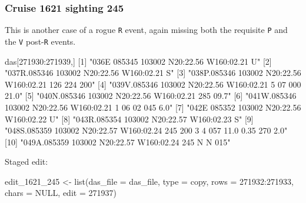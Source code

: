 \documentclass[
]{book}
\newenvironment{Shaded}{\begin{snugshade}}{\end{snugshade}}
\newcommand{\AttributeTok}[1]{\textcolor[rgb]{0.77,0.63,0.00}{#1}}
\newcommand{\ConstantTok}[1]{\textcolor[rgb]{0.00,0.00,0.00}{#1}}
\newcommand{\DecValTok}[1]{\textcolor[rgb]{0.00,0.00,0.81}{#1}}
\newcommand{\FunctionTok}[1]{\textcolor[rgb]{0.00,0.00,0.00}{#1}}
\newcommand{\NormalTok}[1]{#1}
\newcommand{\OtherTok}[1]{\textcolor[rgb]{0.56,0.35,0.01}{#1}}
\newcommand{\SpecialCharTok}[1]{\textcolor[rgb]{0.00,0.00,0.00}{#1}}
\newcommand{\StringTok}[1]{\textcolor[rgb]{0.31,0.60,0.02}{#1}}
\begin{document}
\hypertarget{cruise-1621-sighting-245}{%
\subsubsection*{Cruise 1621 sighting 245}\label{cruise-1621-sighting-245}}

This is another case of a rogue \texttt{R} event, again missing both the requisite \texttt{P} and the \texttt{V} post-\texttt{R} events.

\begin{Shaded}
\begin{Highlighting}[]
\NormalTok{das[}\DecValTok{271930}\SpecialCharTok{:}\DecValTok{271939}\NormalTok{,] }
\NormalTok{ [}\DecValTok{1}\NormalTok{] }\StringTok{"036E 085345 103002 N20:22.56 W160:02.21    U"}                                        
\NormalTok{ [}\DecValTok{2}\NormalTok{] }\StringTok{"037R.085346 103002 N20:22.56 W160:02.21    S"}                                        
\NormalTok{ [}\DecValTok{3}\NormalTok{] }\StringTok{"038P.085346 103002 N20:22.56 W160:02.21  126  224  200"}                              
\NormalTok{ [}\DecValTok{4}\NormalTok{] }\StringTok{"039V.085346 103002 N20:22.56 W160:02.21    5   07  000      21.0"}                    
\NormalTok{ [}\DecValTok{5}\NormalTok{] }\StringTok{"040N.085346 103002 N20:22.56 W160:02.21  285 09.7"}                                   
\NormalTok{ [}\DecValTok{6}\NormalTok{] }\StringTok{"041W.085346 103002 N20:22.56 W160:02.21    1   06   02  045  6.0"}                    
\NormalTok{ [}\DecValTok{7}\NormalTok{] }\StringTok{"042E 085352 103002 N20:22.56 W160:02.22    U"}                                        
\NormalTok{ [}\DecValTok{8}\NormalTok{] }\StringTok{"043R.085354 103002 N20:22.57 W160:02.23    S"}                                        
\NormalTok{ [}\DecValTok{9}\NormalTok{] }\StringTok{"048S.085359 103002 N20:22.57 W160:02.24  245  200    3    4  057 11.0 0.35  270  2.0"}
\NormalTok{[}\DecValTok{10}\NormalTok{] }\StringTok{"049A.085359 103002 N20:22.57 W160:02.24  245         N    N  015"}                    
\end{Highlighting}
\end{Shaded}

Staged edit:

\begin{Shaded}
\begin{Highlighting}[]
\NormalTok{edit\_1621\_245 }\OtherTok{\textless{}{-}} 
  \FunctionTok{list}\NormalTok{(}\AttributeTok{das\_file =}\NormalTok{ das\_file, }
       \AttributeTok{type =} \StringTok{\textquotesingle{}copy\textquotesingle{}}\NormalTok{,}
       \AttributeTok{rows =} \DecValTok{271932}\SpecialCharTok{:}\DecValTok{271933}\NormalTok{,}
       \AttributeTok{chars =} \ConstantTok{NULL}\NormalTok{,}
       \AttributeTok{edit =} \DecValTok{271937}\NormalTok{)}
\end{Highlighting}
\end{Shaded}
\end{document}
